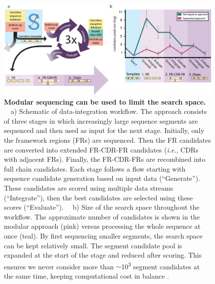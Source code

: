 \begin{figure}[!htb]
  \center
  \includegraphics[]{Chapter.5/Figures/f1.png}
  \caption{\textbf{Modular sequencing can be used to limit the search space.} ~~a) Schematic of data-integration workflow. The approach consists of three stages in which increasingly large sequence segments are sequenced and then used as input for the next stage. Initially, only the framework regions (FRs) are sequenced. Then the FR candidates are converted into extended FR-CDR-FR candidates (\emph{i.e.}, CDRs with adjacent FRs). Finally, the FR-CDR-FRs are recombined into full chain candidates. Each stage follows a flow starting with sequence candidate generation based on input data (“Generate”). These candidates are scored using multiple data streams (“Integrate”), then the best candidates are selected using these scores (“Evaluate”). ~~b) Size of the search space throughout the workflow. The approximate number of candidates is shown in the modular approach (pink) versus processing the whole sequence at once (teal). By first sequencing smaller segments, the search space can be kept relatively small. The segment candidate pool is expanded at the start of the stage and reduced after scoring. This ensures we never consider more than $\sim$10\textsuperscript{3} segment candidates at the same time, keeping computational cost in balance .}
  \label{fig:fig5.1}
\end{figure}


